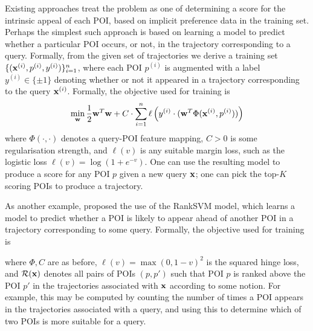 
Existing approaches treat the problem as one of determining a score for the intrinsic appeal of each POI,
based on implicit preference data in the training set.
Perhaps the simplest such approach is based on learning a model to predict whether a particular POI occurs, or not, in the trajectory corresponding to a query.
Formally, from the given set of trajectories
we derive a training set $\{ ( \mathbf{x}^{(i)}, p^{(i)}, y^{(i)} ) \}_{i = 1}^n$,
where each POI $p^{(i)}$ is augmented with a label $y^{(i)} \in \{ \pm 1 \}$ denoting whether or not it appeared in a trajectory corresponding to the query $\mathbf{x}^{(i)}$. 
Formally, the objective used for training is
$$ \min_{\mathbf{w}} \frac{1}{2} \mathbf{w}^T \mathbf{w} + C \cdot \sum_{i = 1}^n \ell\left( y^{(i)} \cdot ( \mathbf{w}^T \Phi( \mathbf{x}^{(i)}, p^{(i)} ) ) \right) $$
where
$\Phi( \cdot, \cdot )$ denotes a query-POI feature mapping,
$C > 0$ is some regularisation strength,
and $\ell( v )$ is any suitable margin loss, such as the logistic loss $\ell( v ) = \log( 1 + e^{-v} )$.
One can use the resulting model to produce a score for any POI $p$ given a new query $\mathbf{x}$;
one can pick the top-$K$ scoring POIs to produce a trajectory.

As another example, \citet{cikm16paper} proposed the use of the RankSVM model,
which %
learns a model to predict whether a POI is likely to appear ahead of another POI in a trajectory corresponding to some query.
Formally, the objective used for training is


where $\Phi, C$ are as before,
$\ell( v ) = \max( 0, 1 - v )^2$ is the squared hinge loss,
and
$\mathcal{R}( \mathbf{x} )$
denotes all pairs of POIs $(p, p')$ such that
POI $p$ is ranked above the POI $p'$ in the trajectories associated with $\mathbf{x}$ according to some notion.
For example, this may be computed \eg by counting the number of times a POI appears in the trajectories associated with a query, and using this to determine which of two POIs is more suitable for a query.

